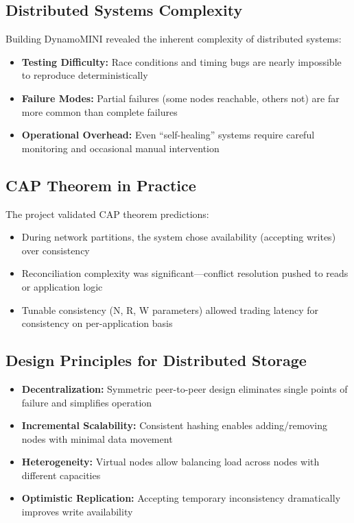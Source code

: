 \documentclass[conference]{IEEEtran}
\begin{document}
\subsection{Distributed Systems Complexity}
Building DynamoMINI revealed the inherent complexity of distributed systems:
\begin{itemize}
    \item \textbf{Testing Difficulty:} Race conditions and timing bugs are nearly impossible to reproduce deterministically
    \item \textbf{Failure Modes:} Partial failures (some nodes reachable, others not) are far more common than complete failures
    \item \textbf{Operational Overhead:} Even ``self-healing'' systems require careful monitoring and occasional manual intervention
\end{itemize}

\subsection{CAP Theorem in Practice}
The project validated CAP theorem predictions:
\begin{itemize}
    \item During network partitions, the system chose availability (accepting writes) over consistency
    \item Reconciliation complexity was significant—conflict resolution pushed to reads or application logic
    \item Tunable consistency (N, R, W parameters) allowed trading latency for consistency on per-application basis
\end{itemize}

\subsection{Design Principles for Distributed Storage}
\begin{itemize}
    \item \textbf{Decentralization:} Symmetric peer-to-peer design eliminates single points of failure and simplifies operation
    \item \textbf{Incremental Scalability:} Consistent hashing enables adding/removing nodes with minimal data movement
    \item \textbf{Heterogeneity:} Virtual nodes allow balancing load across nodes with different capacities
    \item \textbf{Optimistic Replication:} Accepting temporary inconsistency dramatically improves write availability
\end{itemize}
\end{document}

